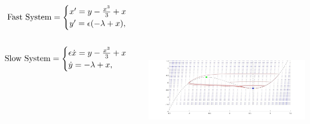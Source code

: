 \documentclass[14pt, a0paper, portrait]{tikzposter}
\begin{document}
\begin{columns}
{
\begin{minipage}{0.5\linewidth}
\begin{align*}{
\text{Fast System}=
    \begin{cases} x'=y-\frac{x^3}{3}+x\\
    y'=\epsilon(-\lambda+ x),
    \end{cases}
}&\\
&\notag\\
{
\text{Slow System}= 
    \begin{cases} \epsilon \dot{x}=y-\frac{x^3}{3}+x\\
    \dot{y}=-\lambda+x,
    \end{cases}
}\end{align*}\end{minipage}
\begin{minipage}{0.50\linewidth}
	\begin{tikzfigure}
        \includegraphics[height=8cm,width=10cm]{Code/behaviourswitch-pres.jpg}
	\end{tikzfigure}
\end{minipage}


}
\end{columns}
\end{document}
